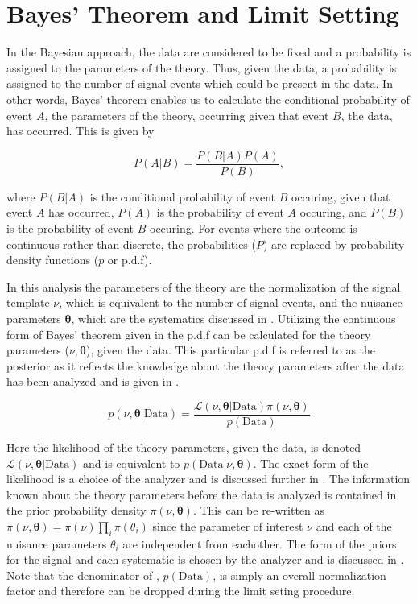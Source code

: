 \section{Bayes' Theorem and Limit Setting} \label{sec:fit:theory}

In the Bayesian approach, the data are considered to be fixed and a probability
is assigned to the parameters of the theory. Thus, given the data, a
probability is assigned to the number of signal events which could be present
in the data.  In other words, Bayes' theorem enables us to calculate the
conditional probability of event $A$, the parameters of the theory, occurring
given that event $B$, the data, has occurred. This is given by 

\begin{equation} \label{sec:fit:general_bayes} 
P(A|B) = \frac{P(B|A)P(A)}{P(B)}, 
\end{equation}

where $P(B|A)$ is the conditional probability of event $B$ occuring, given that
event $A$ has occurred, $P(A)$ is the probability of event $A$ occuring, and
$P(B)$ is the probability of event $B$ occuring. For events where the outcome
is continuous rather than discrete, the probabilities ($P$) are replaced by
probability density functions ($p$ or p.d.f).

In this analysis the parameters of the theory are the normalization of the
signal template $\nu$, which is equivalent to the number of signal events, and
the nuisance parameters $\boldsymbol{\theta}$, which are the systematics
discussed in . Utilizing the continuous form of Bayes'
theorem given in  the p.d.f can be calculated for
the theory parameters ($\nu,\boldsymbol{\theta}$), given the data.  This
particular p.d.f is referred to as the posterior as it reflects the knowledge
about the theory parameters after the data has been analyzed and is given in
.

\begin{equation} \label{eq:fit:posterior}
p(\nu,\boldsymbol{\theta}|\text{Data}) = \frac{\mathcal{L}(\nu,\boldsymbol{\theta}|\text{Data})\pi(\nu,\boldsymbol{\theta})}{p(\text{Data})}
\end{equation}

Here the likelihood of the theory parameters, given the data, is denoted
$\mathcal{L}(\nu,\boldsymbol{\theta}|\text{Data})$ and is equivalent to
$p(\text{Data}|\nu,\boldsymbol{\theta})$.  The exact form of the likelihood is
a choice of the analyzer and is discussed further in . The
information known about the theory parameters before the data is analyzed is
contained in the prior probability density $\pi(\nu,\boldsymbol{\theta})$.
This can be re-written as $\pi(\nu,\boldsymbol{\theta}) =
\pi(\nu)\prod_{i}\pi(\theta_i)$ since the parameter of interest $\nu$ and each
of the nuisance parameters $\theta_i$ are independent from eachother.  The form
of the priors for the signal and each systematic is chosen by the analyzer and
is discussed in .  Note that the denominator of
, $p(\text{Data})$, is simply an overall normalization
factor and therefore can be dropped during the limit seting procedure.

